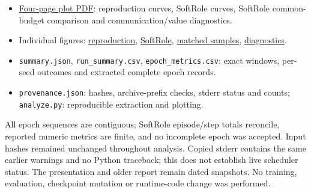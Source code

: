 \documentclass[
  10pt,
]{article}
\providecommand{\tightlist}{%
  \setlength{\itemsep}{0pt}\setlength{\parskip}{0pt}}
\begin{document}
\begin{itemize}
\tightlist
\item
  \href{training_plots.pdf}{Four-page plot PDF}: reproduction curves,
  SoftRole curves, SoftRole common-budget comparison and
  communication/value diagnostics.
\item
  Individual figures: \href{reproduction_training.png}{reproduction},
  \href{softrole_training.png}{SoftRole},
  \href{softrole_common_samples.png}{matched samples},
  \href{softrole_diagnostics.png}{diagnostics}.
\item
  \texttt{summary.json}, \texttt{run\_summary.csv},
  \texttt{epoch\_metrics.csv}: exact windows, per-seed outcomes and
  extracted complete epoch records.
\item
  \texttt{provenance.json}: hashes, archive-prefix checks, stderr status
  and counts; \texttt{analyze.py}: reproducible extraction and plotting.
\end{itemize}

All epoch sequences are contiguous; SoftRole episode/step totals
reconcile, reported numeric metrics are finite, and no incomplete epoch
was accepted. Input hashes remained unchanged throughout analysis.
Copied stderr contains the same earlier warnings and no Python
traceback; this does not establish live scheduler status. The
presentation and older report remain dated snapshots. No training,
evaluation, checkpoint mutation or runtime-code change was performed.
\end{document}
